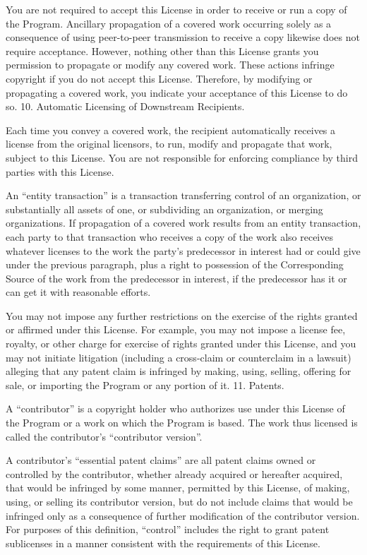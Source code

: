 {\begin{multicols}{4}
You are not required to accept this License in order to receive or run a copy of the Program. Ancillary propagation of a covered work occurring solely as a consequence of using peer-to-peer transmission to receive a copy likewise does not require acceptance. However, nothing other than this License grants you permission to propagate or modify any covered work. These actions infringe copyright if you do not accept this License. Therefore, by modifying or propagating a covered work, you indicate your acceptance of this License to do so.
10. Automatic Licensing of Downstream Recipients.

Each time you convey a covered work, the recipient automatically receives a license from the original licensors, to run, modify and propagate that work, subject to this License. You are not responsible for enforcing compliance by third parties with this License.

An “entity transaction” is a transaction transferring control of an organization, or substantially all assets of one, or subdividing an organization, or merging organizations. If propagation of a covered work results from an entity transaction, each party to that transaction who receives a copy of the work also receives whatever licenses to the work the party's predecessor in interest had or could give under the previous paragraph, plus a right to possession of the Corresponding Source of the work from the predecessor in interest, if the predecessor has it or can get it with reasonable efforts.

You may not impose any further restrictions on the exercise of the rights granted or affirmed under this License. For example, you may not impose a license fee, royalty, or other charge for exercise of rights granted under this License, and you may not initiate litigation (including a cross-claim or counterclaim in a lawsuit) alleging that any patent claim is infringed by making, using, selling, offering for sale, or importing the Program or any portion of it.
11. Patents.

A “contributor” is a copyright holder who authorizes use under this License of the Program or a work on which the Program is based. The work thus licensed is called the contributor's “contributor version”.

A contributor's “essential patent claims” are all patent claims owned or controlled by the contributor, whether already acquired or hereafter acquired, that would be infringed by some manner, permitted by this License, of making, using, or selling its contributor version, but do not include claims that would be infringed only as a consequence of further modification of the contributor version. For purposes of this definition, “control” includes the right to grant patent sublicenses in a manner consistent with the requirements of this License.


\end{multicols}}

